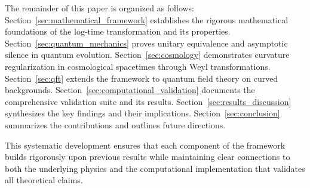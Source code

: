 The remainder of this paper is organized as follows: Section~\ref{sec:mathematical_framework} establishes the rigorous mathematical foundations of the log-time transformation and its properties. Section~\ref{sec:quantum_mechanics} proves unitary equivalence and asymptotic silence in quantum evolution. Section~\ref{sec:cosmology} demonstrates curvature regularization in cosmological spacetimes through Weyl transformations. Section~\ref{sec:qft} extends the framework to quantum field theory on curved backgrounds. Section~\ref{sec:computational_validation} documents the comprehensive validation suite and its results. Section~\ref{sec:results_discussion} synthesizes the key findings and their implications. Section~\ref{sec:conclusion} summarizes the contributions and outlines future directions.

This systematic development ensures that each component of the framework builds rigorously upon previous results while maintaining clear connections to both the underlying physics and the computational implementation that validates all theoretical claims.